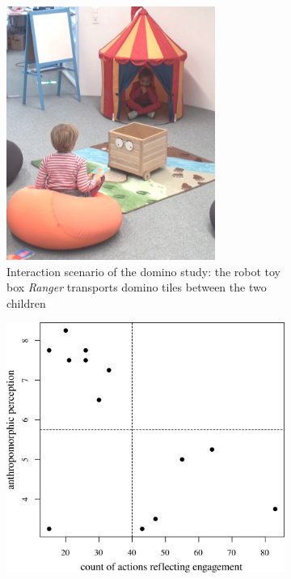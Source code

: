\documentclass{frontiersSCNS} %
\begin{document}
\begin{figure}[b]
        \centering
        \begin{subfigure}[b]{0.48\columnwidth}
                \centering
                \includegraphics[width=0.75\textwidth]{ranger}
                \caption{Interaction scenario of the domino study:
                    the robot toy box \emph{Ranger} transports domino tiles between the two
                children}
                \label{fig:ranger-expe}
        \end{subfigure}%
        \hspace{0.5cm}
        \begin{subfigure}[b]{0.48\columnwidth}
            \includegraphics[width=\textwidth]{correlation}

\end{subfigure}
\end{figure}
\end{document}
